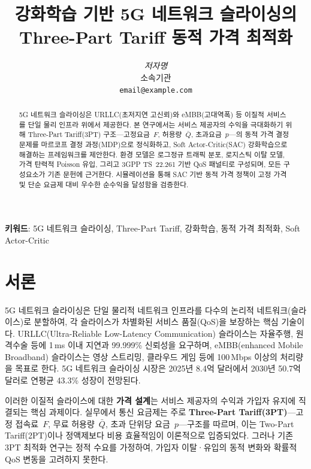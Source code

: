 \documentclass[10pt, twocolumn]{article}
\title{\textbf{강화학습 기반 5G 네트워크 슬라이싱의 \\Three-Part Tariff 동적 가격 최적화}}
\author{
  \textit{저자명} \\
  소속기관 \\
  \texttt{email@example.com}
}
\date{}
\begin{document}
\maketitle

\begin{abstract}
5G 네트워크 슬라이싱은 URLLC(초저지연 고신뢰)와 eMBB(고대역폭) 등 이질적 서비스를 단일 물리 인프라 위에서 제공한다.
본 연구에서는 서비스 제공자의 수익을 극대화하기 위해 Three-Part Tariff(3PT) 구조---고정요금~$F$, 허용량~$\bar{Q}$, 초과요금~$p$---의 동적 가격 결정 문제를 마르코프 결정 과정(MDP)으로 정식화하고, Soft Actor-Critic(SAC) 강화학습으로 해결하는 프레임워크를 제안한다.
환경 모델은 로그정규 트래픽 분포\cite{alasmar2021}, 로지스틱 이탈 모델\cite{ahn2006, ribeiro2023}, 가격 탄력적 Poisson 유입\cite{chen2022}, 그리고 3GPP TS~22.261 기반 QoS 패널티\cite{kim2019}로 구성되며, 모든 구성요소가 기존 문헌에 근거한다.
시뮬레이션을 통해 SAC 기반 동적 가격 정책이 고정 가격 및 단순 요금제 대비 우수한 순수익을 달성함을 검증한다.
\end{abstract}

\textbf{키워드}: 5G 네트워크 슬라이싱, Three-Part Tariff, 강화학습, 동적 가격 최적화, Soft Actor-Critic

\section{서론}

5G 네트워크 슬라이싱은 단일 물리적 네트워크 인프라를 다수의 논리적 네트워크(슬라이스)로 분할하여, 각 슬라이스가 차별화된 서비스 품질(QoS)을 보장하는 핵심 기술이다\cite{kim2019}.
URLLC(Ultra-Reliable Low-Latency Communication) 슬라이스는 자율주행, 원격수술 등에 1\,ms 이내 지연과 99.999\% 신뢰성을 요구하며, eMBB(enhanced Mobile Broadband) 슬라이스는 영상 스트리밍, 클라우드 게임 등에 100\,Mbps 이상의 처리량을 목표로 한다\cite{3gpp22261}.
5G 네트워크 슬라이싱 시장은 2025년 8.4억 달러에서 2030년 50.7억 달러로 연평균 43.3\% 성장이 전망된다.

이러한 이질적 슬라이스에 대한 \textbf{가격 설계}는 서비스 제공자의 수익과 가입자 유지에 직결되는 핵심 과제이다.
실무에서 통신 요금제는 주로 \textbf{Three-Part Tariff(3PT)}---고정 접속료~$F$, 무료 허용량~$\bar{Q}$, 초과 단위당 요금~$p$---구조를 따르며\cite{wu2023}, 이는 Two-Part Tariff(2PT)이나 정액제보다 비용 효율적임이 이론적으로 입증되었다\cite{wu2023}.
그러나 기존 3PT 최적화 연구\cite{wu2023}는 정적 수요를 가정하여, 가입자 이탈·유입의 동적 변화와 확률적 QoS 변동을 고려하지 못한다.
\end{document}
